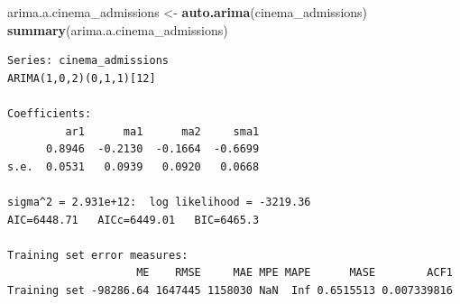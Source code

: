 \documentclass[
]{article}
\newenvironment{Shaded}{\begin{snugshade}}{\end{snugshade}}
\newcommand{\AttributeTok}[1]{\textcolor[rgb]{0.13,0.29,0.53}{#1}}
\newcommand{\ConstantTok}[1]{\textcolor[rgb]{0.56,0.35,0.01}{#1}}
\newcommand{\DecValTok}[1]{\textcolor[rgb]{0.00,0.00,0.81}{#1}}
\newcommand{\FunctionTok}[1]{\textcolor[rgb]{0.13,0.29,0.53}{\textbf{#1}}}
\newcommand{\NormalTok}[1]{#1}
\newcommand{\OtherTok}[1]{\textcolor[rgb]{0.56,0.35,0.01}{#1}}
\newcommand{\SpecialCharTok}[1]{\textcolor[rgb]{0.81,0.36,0.00}{\textbf{#1}}}
\newcommand{\StringTok}[1]{\textcolor[rgb]{0.31,0.60,0.02}{#1}}
\begin{document}
\begin{Shaded}
\end{Shaded}

\begin{Shaded}
\begin{Highlighting}[]
\NormalTok{arima.a.cinema\_admissions }\OtherTok{\textless{}{-}} \FunctionTok{auto.arima}\NormalTok{(cinema\_admissions)}
\FunctionTok{summary}\NormalTok{(arima.a.cinema\_admissions)}
\end{Highlighting}
\end{Shaded}

\begin{verbatim}
Series: cinema_admissions 
ARIMA(1,0,2)(0,1,1)[12] 

Coefficients:
         ar1      ma1      ma2     sma1
      0.8946  -0.2130  -0.1664  -0.6699
s.e.  0.0531   0.0939   0.0920   0.0668

sigma^2 = 2.931e+12:  log likelihood = -3219.36
AIC=6448.71   AICc=6449.01   BIC=6465.3

Training set error measures:
                    ME    RMSE     MAE MPE MAPE      MASE        ACF1
Training set -98286.64 1647445 1158030 NaN  Inf 0.6515513 0.007339816
\end{verbatim}
\end{document}
